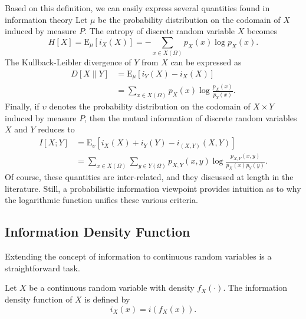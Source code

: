 Based on this definition, we can easily express several quantities found in information theory
Let $\mu$ be the probability distribution on the codomain of $X$ induced by measure $P$.
The entropy of discrete random variable $X$ becomes
\begin{equation*}
H [X] = \mathrm{E}_{\mu} \left[ i_X (X) \right] = - \sum_{x \in X(\Omega)} p_X (x) \log p_X (x) .
\end{equation*}
The Kullback-Leibler divergence of $Y$ from $X$ can be expressed as
\begin{equation*}
\begin{split}
D [X \| Y] &= \mathrm{E}_{\mu} \left[ i_Y (X) - i_X (X) \right] \\
&= \sum_{x \in X(\Omega)} p_X (x) \log \frac{p_X (x)}{p_Y (x)} .
\end{split}
\end{equation*}
Finally, if $\upsilon$ denotes the probability distribution on the codomain of $X \times Y$ induced by measure $P$, then the mutual information of discrete random variables $X$ and $Y$ reduces to
\begin{equation*}
\begin{split}
I [X ; Y] &= \mathrm{E}_{\upsilon} \left[ i_X (X) + i_Y (Y) - i_{(X,Y)} (X,Y) \right] \\
&= \sum_{x \in X(\Omega)} \sum_{y \in Y(\Omega)}
p_{X,Y} (x, y) \log \frac{p_{X,Y} (x, y)}{p_X (x) p_Y (y)} .
\end{split}
\end{equation*}
Of course, these quantities are inter-related, and they discussed at length in the literature.
Still, a probabilistic information viewpoint provides intuition as to why the logarithmic function unifies these various criteria.


\subsection{Information Density Function}

Extending the concept of information to continuous random variables is a straightforward task.

\begin{definition}[IDF]
Let $X$ be a continuous random variable with density $f_X (\cdot)$.
The information density function of $X$ is defined by
\begin{equation*}
i_X (x) = i \left( f_X (x) \right) .
\end{equation*}
\end{definition}


